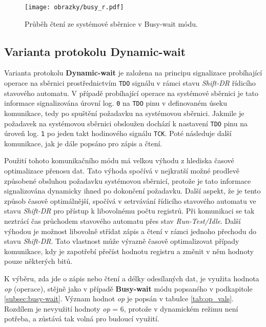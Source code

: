 \begin{figure}[H]
  \begin{center}
    \texttt{[image: obrazky/busy\_r.pdf]}
  \end{center}
  \caption{Průběh čtení ze systémové sběrnice v Busy-wait módu.}
	\label{fig:busy_r}
\end{figure}

\subsection{Varianta protokolu Dynamic-wait}	\label{subsec:dyn-wait}
Varianta protokolu \textbf{Dynamic-wait} je založena na principu signalizace probíhající operace na sběrnici prostřednictvím \texttt{\acs{TDO}} signálu v rámci stavu \textit{Shift-DR} řídicího stavového automatu. V případě probíhající operace na systémové sběrnici je tato informace signalizována úrovní log. \texttt{0} na \texttt{\acs{TDO}} pinu v definovaném úseku komunikace, tedy po spuštění požadavku na systémovou sběrnici. Jakmile je požadavek na systémovou sběrnici obsloužen dochází k nastavení \texttt{\acs{TDO}} pinu na úroveň log. \texttt{1} po jeden takt hodinového signálu \texttt{\acs{TCK}}. Poté následuje další komunikace, jak je dále popsáno pro zápis a čtení.

Použití tohoto komunikačního módu má velkou výhodu z hlediska časové optimalizace přenosu dat. Tato výhoda spočívá v nejkratší možné prodlevě způsobené obsluhou požadavku systémovou sběrnicí, protože je tato informace signalizována dynamicky ihned po dokončení požadavku. Další aspekt, že je tento způsob časově optimálnější, spočívá v setrvávání řídicího stavového automatu ve stavu \textit{Shift-DR} pro přístup k libovolnému počtu registrů. Při komunikaci se tak neztrácí čas průchodem stavového automatu přes stav \textit{Run-Test/Idle}. Další výhodou je možnost libovolně střídat zápis a čtení v rámci jednoho přechodu do stavu \textit{Shift-DR}. Tato vlastnost může výrazně časově optimalizovat případy komunikace, kdy je zapotřebí přečíst hodnotu registru a změnit v něm hodnoty pouze některých bitů.

K výběru, zda jde o zápis nebo čtení a délky odesílaných dat, je využita hodnota \textit{op} (operace), stějně jako v případě \textbf{Busy-wait} módu popsaného v podkapitole \ref{subsec:busy-wait}. Význam hodnot \textit{op} je popsán v tabulce \ref{tab:op_vals}. Rozdílem je nevyužití hodnoty \textit{op} = 6, protože v dynamickém režimu není potřeba, a zůstává tak volná pro budoucí využití.

